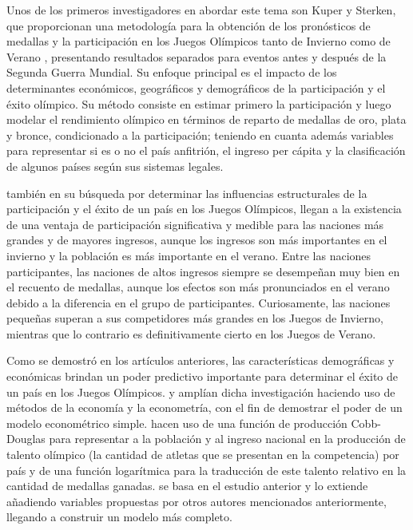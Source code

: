 Unos de los primeros investigadores en abordar este tema son Kuper y Sterken, que proporcionan una metodología para la obtención de los pronósticos de medallas y la participación en los Juegos Olímpicos tanto de Invierno \cite{kuper2001olympic} como de Verano \cite{kuperolympicgerard}, presentando resultados separados para eventos antes y después de la Segunda Guerra Mundial. Su enfoque principal es el impacto de los determinantes económicos, geográficos y demográficos de la participación y el éxito olímpico. Su método consiste en estimar primero la participación y luego modelar el rendimiento olímpico en términos de reparto de medallas de oro, plata y bronce, condicionado a la participación; teniendo en cuanta además variables para representar si es o no el país anfitrión, el ingreso per cápita y la clasificación de algunos países según sus sistemas legales.

\cite{johnson2004tale} también en su búsqueda por determinar las influencias estructurales de la participación y el éxito de un país en los Juegos Olímpicos, llegan a la existencia de una ventaja de participación significativa y medible para las naciones más grandes y de mayores ingresos, aunque los ingresos son más importantes en el invierno y la población es más importante en el verano. Entre las naciones participantes, las naciones de altos ingresos siempre se desempeñan muy bien en el recuento de medallas, aunque los efectos son más pronunciados en el verano debido a la diferencia en el grupo de participantes. Curiosamente, las naciones pequeñas superan a sus competidores más grandes en los Juegos de Invierno, mientras que lo contrario es definitivamente cierto en los Juegos de Verano. 

Como se demostró en los artículos anteriores, las características demográficas y económicas brindan un poder predictivo importante para determinar el éxito de un país en los Juegos Olímpicos. \cite{bernard2004wins} y \cite{pfau2006predicting} amplían dicha investigación haciendo uso de métodos de la economía y la econometría, con el fin de demostrar el poder de un modelo econométrico simple. \cite{bernard2004wins} hacen uso de una función de producción Cobb-Douglas para representar a la población y al ingreso nacional en la producción de talento olímpico (la cantidad de atletas que se presentan en la competencia) por país y de una función logarítmica para la traducción de este talento relativo en la cantidad de medallas ganadas. \cite{pfau2006predicting} se basa en el estudio anterior y lo extiende añadiendo variables propuestas por otros autores mencionados anteriormente, llegando a construir un modelo más completo. 

